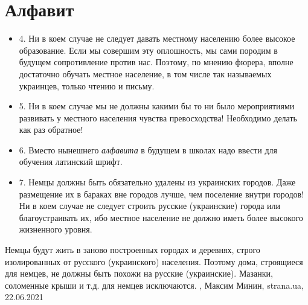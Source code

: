  
 
 
 
 
\chapter{Алфавит}
\label{sec:slova.alfavit}

\begin{itemize}
\item 4. Ни в коем случае не следует давать местному населению более высокое образование. Если мы совершим эту оплошность, мы сами породим в будущем сопротивление против нас. Поэтому, по мнению фюрера, вполне достаточно обучать местное население, в том числе так называемых украинцев, только чтению и письму.
\item 5. Ни в коем случае мы не должны какими бы то ни было мероприятиями развивать у местного населения чувства превосходства! Необходимо делать как раз обратное!
\item 6. Вместо нынешнего \emph{алфавита} в будущем в школах надо ввести для обучения латинский шрифт.
\item 7. Немцы должны быть обязательно удалены из украинских городов. Даже размещение их в бараках вне городов лучше, чем поселение внутри городов! Ни в коем случае не следует строить русские (украинские) города или благоустраивать их, ибо местное население не должно иметь более высокого жизненного уровня.
\end{itemize}
Немцы будут жить в заново построенных городах и деревнях, строго изолированных
от русского (украинского) населения. Поэтому дома, строящиеся для немцев, не
должны быть похожи на русские (украинские). Мазанки, соломенные крыши и т.д.
для немцев исключаются.
 , Максим Минин, strana.ua, 22.06.2021


